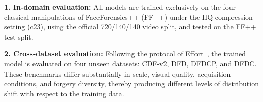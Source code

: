 \documentclass[fonts]{icst}
\begin{document}
\begin{table}[h]
  \centering
  \caption{Datasets used for training and evaluation.
NoGenMethod denotes the number of forgery methods in each dataset.}
  \label{tab:datasets}
  \small
  \setlength{\tabcolsep}{2pt}
  \renewcommand{\arraystretch}{1.1}
\end{table}

\textbf{1. In-domain evaluation:}
All models are trained exclusively on the four classical manipulations of FaceForensics++ (FF++) under the HQ compression setting (c23), using the official 720/140/140 video split, and tested on the FF++ test split.

\textbf{2. Cross-dataset evaluation:}
Following the protocol of Effort~\cite{yan2025effort}, the trained model is evaluated on four unseen datasets: CDF-v2, DFD, DFDCP, and DFDC.
These benchmarks differ substantially in scale, visual quality, acquisition conditions, and forgery diversity, thereby producing different levels of distribution shift with respect to the training data.
\end{document}
